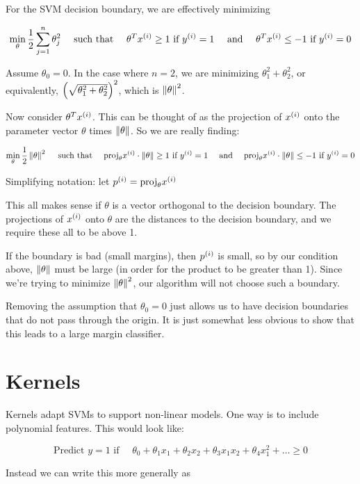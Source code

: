 For the SVM decision boundary, we are effectively minimizing

\[
    \min_\theta \frac{1}{2} \sum_{j=1}^n \theta_j^2  
    \quad \text{ such that } \quad
    \theta^T x_{}^{(i)} \geq 1 \text{ if } y_{}^{(i)}=1
    \quad \text{ and } \quad
    \theta^T x_{}^{(i)} \leq -1 \text{ if } y_{}^{(i)}=0
\]

Assume $\theta_0 = 0$.
In the case where $n=2$, we are minimizing $\theta_1^2 + \theta_2^2$,
or equivalently, $\qty(\sqrt{\theta_1^2 + \theta_2^2})^2$, which is $\left\lVert \theta \right\rVert^2$.

Now consider $\theta^T x_{}^{(i)}$.  This can be thought of as the projection of $x_{}^{(i)}$
onto the parameter vector $\theta$ times $\left\lVert \theta \right\rVert$.
So we are really finding:

\[
    \min_\theta \frac{1}{2} \left\lVert \theta \right\rVert^2
    \quad \text{ such that } \quad
    \mathrm{proj}_\theta x_{}^{(i)} \cdot \left\lVert \theta \right\rVert \geq 1 \text{ if } y_{}^{(i)}=1
    \quad \text{ and } \quad
    \mathrm{proj}_\theta x_{}^{(i)} \cdot \left\lVert \theta \right\rVert \leq -1 \text{ if } y_{}^{(i)}=0
\]

Simplifying notation: let $p_{}^{(i)} = \mathrm{proj}_\theta x_{}^{(i)}$

This all makes sense if $\theta$ is a vector orthogonal to the decision boundary.
The projections of $x_{}^{(i)}$ onto $\theta$ are the distances to the decision boundary,
and we require these all to be above 1.

If the boundary is bad (small margins), then $p_{}^{(i)}$ is small,
so by our condition above, $\left\lVert \theta \right\rVert$ must be large
(in order for the product to be greater than 1).
Since we're trying to minimize $\left\lVert \theta \right\rVert^2$, our algorithm will not choose such a boundary.

Removing the assumption that $\theta_0=0$ just allows us to have 
decision boundaries that do not pass through the origin.
It is just somewhat less obvious to show that this leads to a large margin classifier.

\section{Kernels}

Kernels adapt SVMs to support non-linear models.
One way is to include polynomial features.
This would look like:

\[
    \text{Predict } y=1 \text{ if } \quad
    \theta_0 + \theta_1 x_1 + \theta_2 x_2 + \theta_3 x_1 x_2 + \theta_4 x_1^2 + \dots \geq 0
\]

Instead we can write this more generally as 


